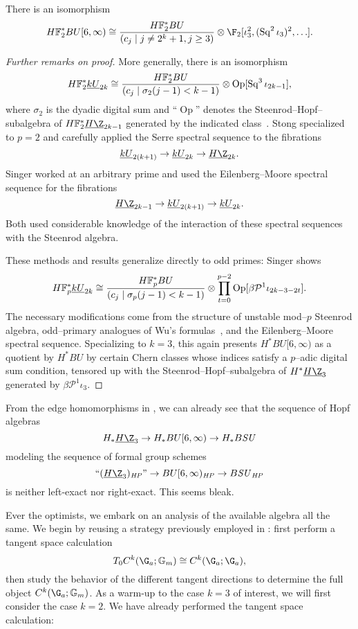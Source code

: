 \begin{theorem}\label{HF2BU6Calculation}
There is an isomorphism \[\HFtwo^* BU[6, \infty) \cong \frac{\HFtwo^* BU}{(c_j \mid j \ne 2^k + 1, j \ge 3)} \otimes \F_2[\iota_3^2, (\Sq^2 \iota_3)^2, \ldots].\]
\end{theorem}
\begin{proof}[Further remarks on proof]
More generally, there is an isomorphism \[\HFtwo^* \OS{kU}{2k} \cong \frac{\HFtwo^* BU}{(c_j \mid \sigma_2(j - 1) < k - 1)} \otimes \operatorname{Op}[\Sq^3 \iota_{2k-1}],\] where \(\sigma_2\) is the dyadic digital sum and ``\(\operatorname{Op}\)'' denotes the Steenrod--Hopf--subalgebra of \(\HFtwo^* \OS{H\Z}{2k-1}\) generated by the indicated class~\cite{Singer,Stong}.  Stong specialized to \(p = 2\) and carefully applied the Serre spectral sequence to the fibrations \[\OS{kU}{2(k+1)} \to \OS{kU}{2k} \to \OS{H\Z}{2k}.\]  Singer worked at an arbitrary prime and used the Eilenberg--Moore spectral sequence for the fibrations \[\OS{H\Z}{2k-1} \to \OS{kU}{2(k+1)} \to \OS{kU}{2k}.\]  Both used considerable knowledge of the interaction of these spectral sequences with the Steenrod algebra.

These methods and results generalize directly to odd primes: Singer shows \[\HFp^* \OS{kU}{2k} \cong \frac{\HFp^* BU}{(c_j \mid \sigma_p(j-1) < k-1)} \otimes \prod_{t=0}^{p-2} \operatorname{Op}[\beta \mathcal P^1 \iota_{2k-3-2t}].\]  The necessary modifications come from the structure of unstable mod--\(p\) Steenrod algebra, odd--primary analogues of Wu's formulas~\cite{Shay}, and the Eilenberg--Moore spectral sequence.  Specializing to \(k = 3\), this again presents \(H^* BU[6, \infty)\) as a quotient by \(H^* BU\) by certain Chern classes whose indices satisfy a \(p\)--adic digital sum condition, tensored up with the Steenrod--Hopf--subalgebra of \(H^* \OS{H\Z}{3}\) generated by \(\beta \mathcal P^1 \iota_3\).
\end{proof}

From the edge homomorphisms in , we can already see that the sequence of Hopf algebras \[H_* \OS{H\Z}{3} \to H_* BU[6, \infty) \to H_* B\SU\] modeling the sequence of formal group schemes \[\text{``\((\OS{H\Z}{3})_{\mathit{HP}}\)''} \to BU[6, \infty)_{\mathit{HP}} \to B\SU_{\mathit{HP}}\] is neither left-exact nor right-exact.  This seems bleak.

Ever the optimists, we embark on an analysis of the available algebra all the same.  We begin by reusing a strategy previously employed in : first perform a tangent space calculation \[T_0 C^k(\G_a; \Gm) \cong C^k(\G_a; \G_a),\] then study the behavior of the different tangent directions to determine the full object \(C^k(\G_a; \Gm)\).  As a warm-up to the case \(k = 3\) of interest, we will first consider the case \(k = 2\).  We have already performed the tangent space calculation:

